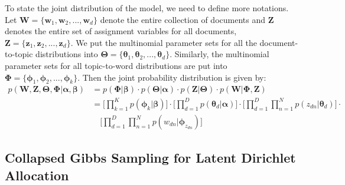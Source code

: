 To state the joint distribution of the model, we need to define more notations. Let $\boldsymbol{W}=\{\boldsymbol{w}_1, \boldsymbol{w}_2, ..., \boldsymbol{w}_d\}$ denote the entire collection of documents and $\boldsymbol{Z}$ denotes the entire set of assignment variables for all documents, $\boldsymbol{Z} = \{\boldsymbol{z}_1, \boldsymbol{z}_2, ..., \boldsymbol{z}_d\}$. We put the multinomial parameter sets for all the document-to-topic distributions into $\boldsymbol{\Theta}=\{\boldsymbol{\theta}_{1}, \boldsymbol{\theta}_{2}, ..., \boldsymbol{\theta}_{d}\}$. Similarly, the multinomial parameter sets for all topic-to-word distributions are put into $\boldsymbol{\Phi}=\{\boldsymbol{\phi}_1, \boldsymbol{\phi}_2, ..., \boldsymbol{\phi}_k\}$. Then the joint probability distribution is given by:
\begin{equation}
\begin{aligned}
p(\boldsymbol{W}, \boldsymbol{Z}, \boldsymbol{\Theta}, \boldsymbol{\Phi} \vert \boldsymbol{\alpha}, \boldsymbol{\beta}) &= p(\boldsymbol{\Phi} \vert \boldsymbol{\beta}) \cdot p(\boldsymbol{\Theta} \vert \boldsymbol{\alpha}) \cdot p(\boldsymbol{Z} \vert \boldsymbol{\Theta}) \cdot  p(\boldsymbol{W} \vert \boldsymbol{\Phi}, \boldsymbol{Z}) \\
                                                                                                                                                                                          &= \Bigg[\prod_{k=1}^{K} p(\boldsymbol{\phi}_k \vert \boldsymbol{\beta})\Bigg] \cdot \Bigg[\prod_{d=1}^{D} p(\boldsymbol{\theta}_d \vert \boldsymbol{\alpha})\Bigg] \cdot \Bigg[\prod_{d=1}^{D} \prod_{n=1}^{N} p(z_{dn} \vert \boldsymbol{\theta}_d)\Bigg] \cdot \\
                                                                                                                                                                                           &\quad \Bigg[\prod_{d=1}^{D} \prod_{n=1}^{N} p(w_{dn} \vert \boldsymbol{\phi}_{z_{dn}})\Bigg]
\end{aligned}
\label{eq:background-lda-full-joint}
\end{equation}

\subsection{Collapsed Gibbs Sampling for Latent Dirichlet Allocation}


